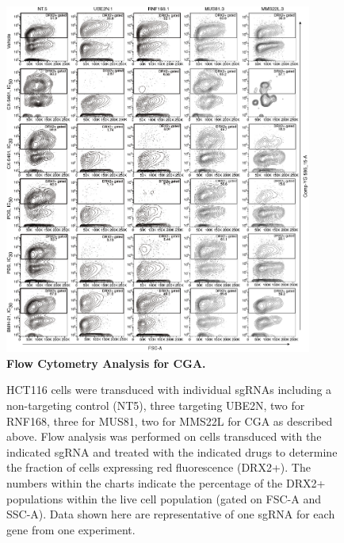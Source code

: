 \begin{figure}
    \centering
    \includegraphics[width=0.9\textwidth]{supplement/figures/CGA_flow_analysis}
    \caption[CGA flow analysis]
            {\small{\textbf{Flow Cytometry Analysis for CGA.}}
            }
        \label{sfig:validation_flow_graphs}
\end{figure}

\addtocounter{figure}{-1}
\begin{figure}
  \caption{
             HCT116 cells were transduced with individual sgRNAs including a non-targeting control (NT5), three targeting UBE2N, two for RNF168, three for MUS81, two for MMS22L for CGA as described above. Flow analysis was performed on cells transduced with the indicated sgRNA and treated with the indicated drugs to determine the fraction of cells expressing red fluorescence (DRX2+). The numbers within the charts indicate the percentage of the DRX2+ populations within the live cell population (gated on FSC-A and SSC-A). Data shown here are representative of one sgRNA for each gene from one experiment.    
    }
\end{figure}

\clearpage

